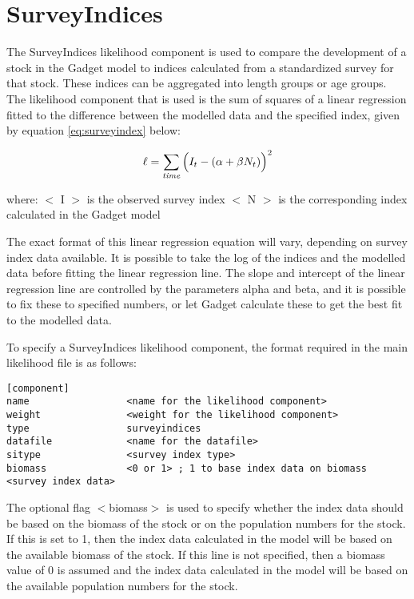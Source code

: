 \documentclass[]{book}
\begin{document}
\hypertarget{sec:surveyindices}{%
\section{SurveyIndices}\label{sec:surveyindices}}

The SurveyIndices likelihood component is used to compare the
development of a stock in the Gadget model to indices calculated from a
standardized survey for that stock. These indices can be aggregated into
length groups or age groups. The likelihood component that is used is
the sum of squares of a linear regression fitted to the difference
between the modelled data and the specified index, given by
equation \eqref{eq:surveyindex} below:

\begin{equation}
\label{eq:surveyindex}
\ell = \sum_{\it time}\Big(I_{t} - (\alpha + \beta N_{t})\Big)^2\end{equation}

where: \(<\) I \(>\) is the observed survey index \(<\) N \(>\) is the
corresponding index calculated in the Gadget model

The exact format of this linear regression equation will vary, depending
on survey index data available. It is possible to take the log of the
indices and the modelled data before fitting the linear regression line.
The slope and intercept of the linear regression line are controlled by
the parameters alpha and beta, and it is possible to fix these to
specified numbers, or let Gadget calculate these to get the best fit to
the modelled data.

To specify a SurveyIndices likelihood component, the format required in
the main likelihood file is as follows:

\begin{verbatim}
[component]
name                 <name for the likelihood component>
weight               <weight for the likelihood component>
type                 surveyindices
datafile             <name for the datafile>
sitype               <survey index type>
biomass              <0 or 1> ; 1 to base index data on biomass
<survey index data>
\end{verbatim}

The optional flag \(<\)biomass\(>\) is used to specify whether the index
data should be based on the biomass of the stock or on the population
numbers for the stock. If this is set to 1, then the index data
calculated in the model will be based on the available biomass of the
stock. If this line is not specified, then a biomass value of 0 is
assumed and the index data calculated in the model will be based on the
available population numbers for the stock.
\end{document}
